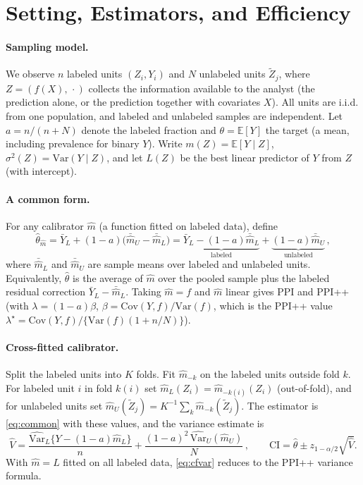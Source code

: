 \section{Setting, Estimators, and Efficiency}
\label{sec:setting}

\paragraph{Sampling model.}
We observe $n$ labeled units $(Z_i,Y_i)$ and $N$ unlabeled units $\tilde Z_j$, where $Z=(f(X),\,\cdot)$ collects the information available to the analyst (the prediction alone, or the prediction together with covariates $X$). All units are i.i.d. from one population, and labeled and unlabeled samples are independent. Let $a=n/(n+N)$ denote the labeled fraction and $\theta=\mathbb E[Y]$ the target (a mean, including prevalence for binary $Y$). Write $m(Z)=\mathbb E[Y\mid Z]$, $\sigma^2(Z)=\mathrm{Var}(Y\mid Z)$, and let $L(Z)$ be the best linear predictor of $Y$ from $Z$ (with intercept).

\paragraph{A common form.}
For any calibrator $\hat m$ (a function fitted on labeled data), define
\begin{equation}
\hat\theta_{\hat m}
=\bar Y_L+(1-a)\Big(\bar{\hat m}_U-\bar{\hat m}_L\Big)
=\underbrace{\bar Y_L-(1-a)\bar{\hat m}_L}_{\text{labeled}}
+\underbrace{(1-a)\bar{\hat m}_U}_{\text{unlabeled}}\,,
\label{eq:common}
\end{equation}
where $\bar{\hat m}_L$ and $\bar{\hat m}_U$ are sample means over labeled and unlabeled units. Equivalently, $\hat\theta$ is the average of $\hat m$ over the pooled sample plus the labeled residual correction $\bar Y_L-\bar{\hat m}_L$. Taking $\hat m=f$ and $\hat m$ linear gives PPI and PPI++ (with $\lambda=(1-a)\beta$, $\beta=\mathrm{Cov}(Y,f)/\mathrm{Var}(f)$, which is the PPI++ value $\lambda^\star=\mathrm{Cov}(Y,f)/\{\mathrm{Var}(f)(1+n/N)\}$).

\paragraph{Cross-fitted calibrator.}
Split the labeled units into $K$ folds. Fit $\hat m_{-k}$ on the labeled units outside fold $k$. For labeled unit $i$ in fold $k(i)$ set $\hat m_L(Z_i)=\hat m_{-k(i)}(Z_i)$ (out-of-fold), and for unlabeled units set $\hat m_U(\tilde Z_j)=K^{-1}\sum_k\hat m_{-k}(\tilde Z_j)$. The estimator is \eqref{eq:common} with these values, and the variance estimate is
\begin{equation}
\widehat V=\frac{\widehat{\mathrm{Var}}_L\{Y-(1-a)\hat m_L\}}{n}+\frac{(1-a)^2\,\widehat{\mathrm{Var}}_U(\hat m_U)}{N}\,,
\qquad \mathrm{CI}=\hat\theta\pm z_{1-\alpha/2}\sqrt{\widehat V}.
\label{eq:cfvar}
\end{equation}
With $\hat m=L$ fitted on all labeled data, \eqref{eq:cfvar} reduces to the PPI++ variance formula.


